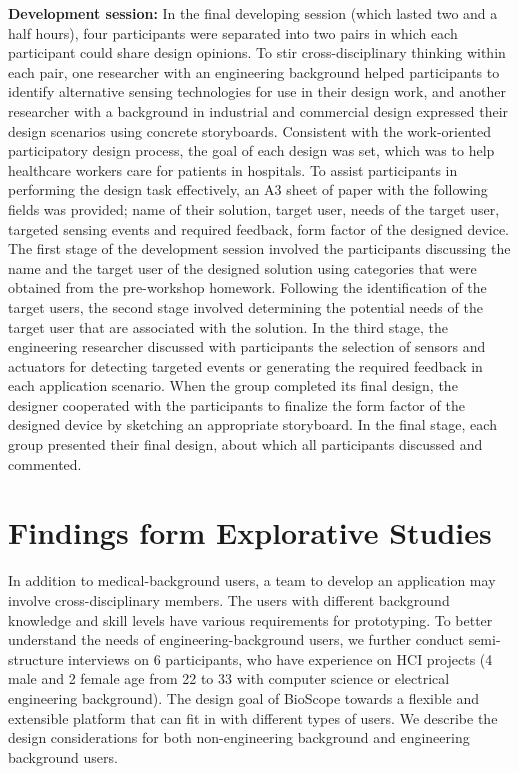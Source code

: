 \textbf{Development session:} 
\newline
In the final developing session (which lasted two and a half hours), four participants were separated into two pairs in which each participant could share design opinions. To stir cross-disciplinary thinking within each pair, one researcher with an engineering background helped participants to identify alternative sensing technologies for use in their design work, and another researcher with a background in industrial and commercial design expressed their design scenarios using concrete storyboards. Consistent with the work-oriented participatory design process, the goal of each design was set, which was to help healthcare workers care for patients in hospitals. To assist participants in performing the design task effectively, an A3 sheet of paper with the following fields was provided; name of their solution, target user, needs of the target user, targeted sensing events and required feedback, form factor of the designed device. The first stage of the development session involved the participants discussing the name and the target user of the designed solution using categories that were obtained from the pre-workshop homework. Following the identification of the target users, the second stage involved determining the potential needs of the target user that are associated with the solution. In the third stage, the engineering researcher discussed with participants the selection of sensors and actuators for detecting targeted events or generating the required feedback in each application scenario. When the group completed its final design, the designer cooperated with the participants to finalize the form factor of the designed device by sketching an appropriate storyboard. In the final stage, each group presented their final design, about which all participants discussed and commented.

\section{Findings form Explorative Studies}
In addition to medical-background users, a team to develop an application may involve cross-disciplinary members.
The users with different background knowledge and skill levels have various requirements for prototyping. 
To better understand the needs of engineering-background users, we further conduct semi-structure interviews on 6 participants, who have experience on HCI projects (4 male and 2 female age from 22 to 33 with computer science or electrical engineering background).
The design goal of BioScope towards a flexible and extensible platform that can fit in with different types of users. We describe the design considerations for both non-engineering background and engineering background users.

